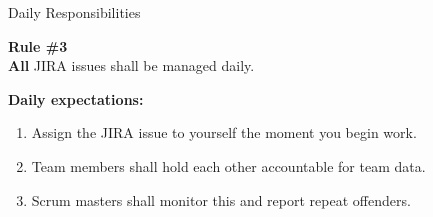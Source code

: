 \documentclass[10pt]{beamer}
\begin{document}

\begin{frame}{Daily Responsibilities}%
  \begin{mdframed}[style=HavasuLightBlueStyle]%
    \textbf{Rule \#3}\\%
    \textbf{All} JIRA issues shall be managed daily.
  \end{mdframed}%
  \begin{mdframed}[style=HavasuLightGreenStyle]%
    \textbf{Daily expectations:}%
    \begin{enumerate}%
      \item Assign the JIRA issue to yourself the moment you begin work.
      \item Team members shall hold each other accountable for team data.
      \item Scrum masters shall monitor this and report repeat offenders.
    \end{enumerate}%
  \end{mdframed}%
\end{frame}%

\end{document}
